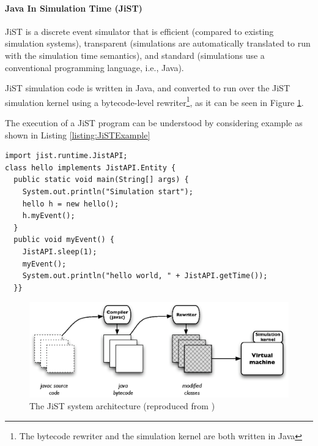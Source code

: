 \paragraph{Java In Simulation Time (JiST)} \label{subsec:jist}

JiST \cite{barr_JIST:2005} is a discrete event simulator that is 
efficient (compared to existing simulation systems), 
transparent (simulations are automatically translated to run with the 
simulation time semantics), and standard (simulations use a
conventional programming language, i.e., Java).

JiST simulation code is written in Java, and converted to run over the JiST 
simulation kernel using a bytecode-level rewriter\footnote{The bytecode 
rewriter and the simulation kernel are both written in Java},  as it can be
seen in Figure \ref{Fig:JiST_architecture}.

The execution of a JiST program can be understood by considering example as
shown in Listing \ref{listing:JiSTExample}

\begin{lstlisting}[frame=trbl, basewidth={0.55em, 0.6em}, captionpos=b, 
basicstyle=\ttfamily\footnotesize, breaklines, caption = Example JiST program (reproduced from \cite{barr_JIST:2005}, label = listing:JiSTExample]  
import jist.runtime.JistAPI;  
class hello implements JistAPI.Entity { 
  public static void main(String[] args) { 
    System.out.println("Simulation start"); 
    hello h = new hello(); 
    h.myEvent(); 
  } 
  public void myEvent() { 
    JistAPI.sleep(1); 
    myEvent(); 
    System.out.println("hello world, " + JistAPI.getTime()); 
  }} 
\end{lstlisting}

\begin{figure}
\centering
\includegraphics[width=\textwidth]{img/JiST_architecture.eps} 
\caption[The JiST System Architecture]{The JiST system architecture (reproduced from
\cite{barr_JIST:2005})}
\label{Fig:JiST_architecture}
\end{figure}  
 
